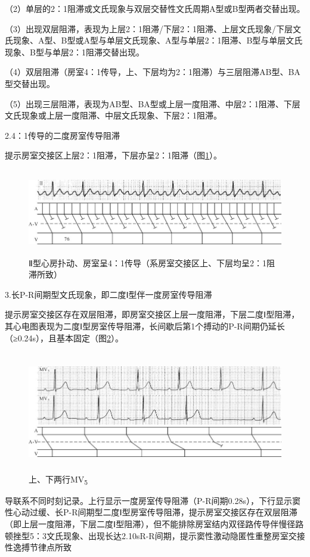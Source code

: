 （2）单层的2：1阻滞或文氏现象与双层交替性文氏周期A型或B型两者交替出现。

（3）出现双层阻滞，表现为上层2：1阻滞/下层2：1阻滞、上层文氏现象/下层文氏现象、A型、B型或A型与单层文氏现象、A型与单层2：1阻滞、B型与单层文氏现象、B型与单层2：1阻滞交替出现。

（4）双层阻滞（房室4：1传导，上、下层均为2：1阻滞）与三层阻滞AB型、BA型交替出现。

（5）出现三层阻滞，表现为AB型、BA型或上层一度阻滞、中层2：1阻滞、下层文氏现象或上层一度阻滞、中层文氏现象、下层2：1阻滞。

2.4：1传导的二度房室传导阻滞

提示房室交接区上层2：1阻滞，下层亦呈2：1阻滞（图\ref{fig24-3}）。

\begin{figure}[!htbp]
 \centering
 \includegraphics[width=5.79167in,height=1.47917in]{./images/Image00398.jpg}
 \captionsetup{justification=centering}
 \caption{Ⅱ型心房扑动、房室呈4：1传导（系房室交接区上、下层均呈2：1阻滞所致）}
 \label{fig24-3}
  \end{figure} 

3.长P-R间期型文氏现象，即二度Ⅰ型伴一度房室传导阻滞

提示房室交接区存在双层阻滞，即房室交接区上层一度阻滞，下层二度Ⅰ型阻滞，其心电图表现为二度Ⅰ型房室传导阻滞，长间歇后第1个搏动的P-R间期仍延长（≥0.24s），且基本固定（图\ref{fig24-4}）。

\begin{figure}[!htbp]
 \centering
 \includegraphics[width=5.80208in,height=2.07292in]{./images/Image00399.jpg}
 \captionsetup{justification=centering}
 \caption{上、下两行MV\textsubscript{5}}
 \label{fig24-4}
  \end{figure} 
导联系不同时刻记录。上行显示一度房室传导阻滞（P-R间期0.28s），下行显示窦性心动过缓、长P-R间期型二度Ⅰ型房室传导阻滞，提示房室交接区存在双层阻滞（即上层一度阻滞，下层二度Ⅰ型阻滞），但不能排除房室结内双径路传导伴慢径路顿挫型5：3文氏现象、出现长达2.10sR-R间期，提示窦性激动隐匿性重整房室交接性逸搏节律点所致

